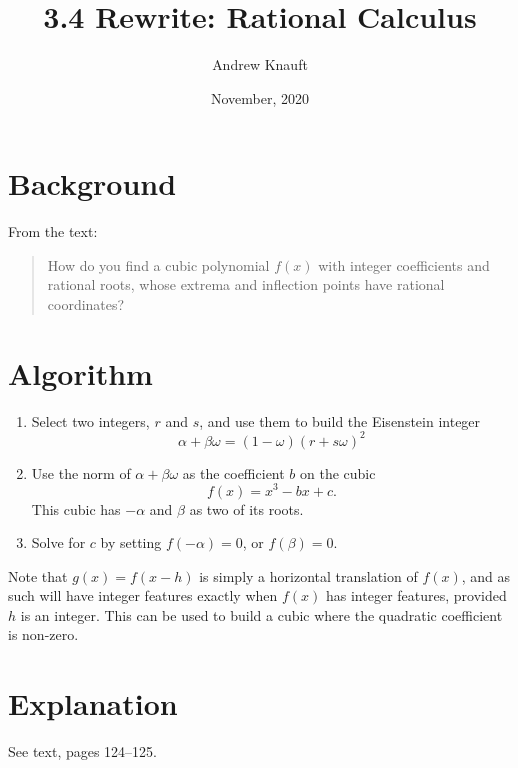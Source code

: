 \documentclass{article}
\title{3.4 Rewrite: Rational Calculus}
\author{Andrew Knauft}
\date{November, 2020}
\begin{document}
\maketitle

\section{Background}
From the text: 
\begin{quote}
    How do you find a cubic polynomial \(f(x)\) with integer coefficients and rational roots, whose extrema and inflection points have rational coordinates?
\end{quote}
\section{Algorithm}
\begin{enumerate}
    \item Select two integers, \(r\) and \(s\), and use them to build the Eisenstein integer
    \[
        \alpha+\beta\omega = (1-\omega)(r+s\omega)^2
    \]
    \item Use the norm of \(\alpha+\beta\omega\) as the coefficient \(b\) on the cubic 
    \[
        f(x)=x^3-bx+c.
    \]
    This cubic has \(-\alpha\) and \(\beta\) as two of its roots.
    \item Solve for \(c\) by setting \(f(-\alpha)=0\), or \(f(\beta)=0\).
\end{enumerate}
Note that \(g(x) = f(x-h)\) is simply a horizontal translation of \(f(x)\), and as such will have integer features exactly when \(f(x)\) has integer features, provided \(h\) is an integer. This can be used to build a cubic where the quadratic coefficient is non-zero.

\section{Explanation}
See text, pages 124--125.
\end{document}
